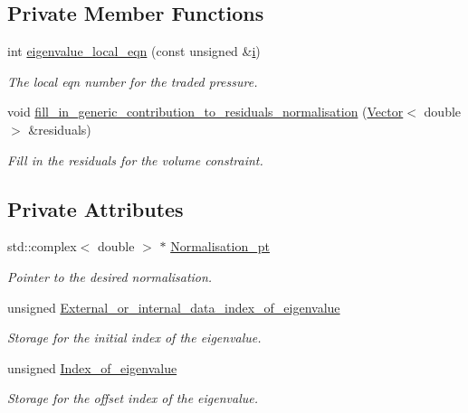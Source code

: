 \subsection*{Private Member Functions}
\begin{DoxyCompactItemize}
\item 
int \hyperlink{classoomph_1_1LinearisedNavierStokesEigenfunctionNormalisationElement_aa129057d2e20f574e76f4f316d930afe}{eigenvalue\+\_\+local\+\_\+eqn} (const unsigned \&\hyperlink{cfortran_8h_adb50e893b86b3e55e751a42eab3cba82}{i})
\begin{DoxyCompactList}\small\item\em The local eqn number for the traded pressure. \end{DoxyCompactList}\item 
void \hyperlink{classoomph_1_1LinearisedNavierStokesEigenfunctionNormalisationElement_afb457ae7cd08c9b3c76f4b24ff81e132}{fill\+\_\+in\+\_\+generic\+\_\+contribution\+\_\+to\+\_\+residuals\+\_\+normalisation} (\hyperlink{classoomph_1_1Vector}{Vector}$<$ double $>$ \&residuals)
\begin{DoxyCompactList}\small\item\em Fill in the residuals for the volume constraint. \end{DoxyCompactList}\end{DoxyCompactItemize}
\subsection*{Private Attributes}
\begin{DoxyCompactItemize}
\item 
std\+::complex$<$ double $>$ $\ast$ \hyperlink{classoomph_1_1LinearisedNavierStokesEigenfunctionNormalisationElement_ad80670e9f19b1ae05e22a3ddfa5c4955}{Normalisation\+\_\+pt}
\begin{DoxyCompactList}\small\item\em Pointer to the desired normalisation. \end{DoxyCompactList}\item 
unsigned \hyperlink{classoomph_1_1LinearisedNavierStokesEigenfunctionNormalisationElement_ab76cf80d4d2c9856b1bde4b835107c99}{External\+\_\+or\+\_\+internal\+\_\+data\+\_\+index\+\_\+of\+\_\+eigenvalue}
\begin{DoxyCompactList}\small\item\em Storage for the initial index of the eigenvalue. \end{DoxyCompactList}\item 
unsigned \hyperlink{classoomph_1_1LinearisedNavierStokesEigenfunctionNormalisationElement_a4bf79b49dc13cd20d3640e622656657e}{Index\+\_\+of\+\_\+eigenvalue}
\begin{DoxyCompactList}\small\item\em Storage for the offset index of the eigenvalue. \end{DoxyCompactList}\end{DoxyCompactItemize}
